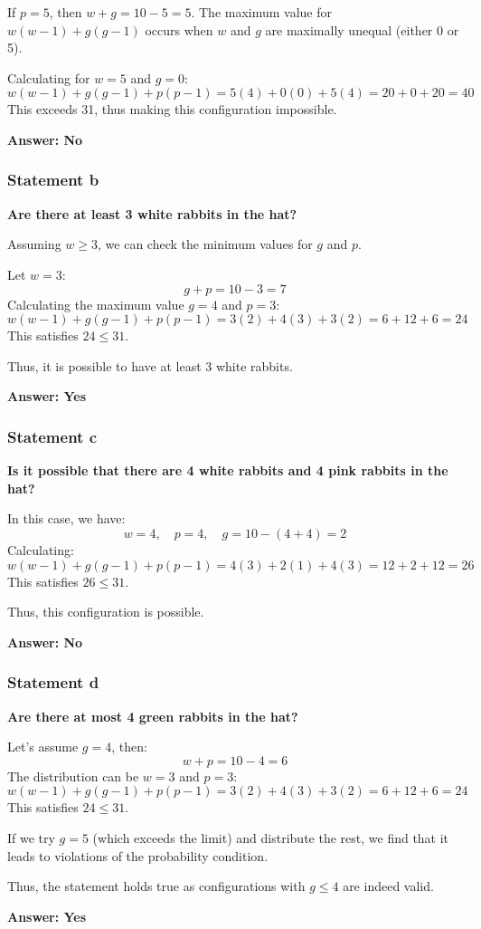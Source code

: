 \documentclass{article}
\begin{document}
If \( p = 5 \), then \( w + g = 10 - 5 = 5 \). The maximum value for \( w(w-1) + g(g-1) \) occurs when \( w \) and \( g \) are maximally unequal (either 0 or 5).

Calculating for \( w = 5 \) and \( g = 0 \):
\[
w(w-1) + g(g-1) + p(p-1) = 5(4) + 0(0) + 5(4) = 20 + 0 + 20 = 40
\]
This exceeds 31, thus making this configuration impossible.

\textbf{Answer: No}

\subsubsection{Statement b}
\textbf{Are there at least 3 white rabbits in the hat?}

Assuming \( w \geq 3 \), we can check the minimum values for \( g \) and \( p \).

Let \( w = 3 \):
\[
g + p = 10 - 3 = 7
\]
Calculating the maximum value \( g = 4 \) and \( p = 3 \):
\[
w(w-1) + g(g-1) + p(p-1) = 3(2) + 4(3) + 3(2) = 6 + 12 + 6 = 24
\]
This satisfies \( 24 \leq 31 \).

Thus, it is possible to have at least 3 white rabbits.

\textbf{Answer: Yes}

\subsubsection{Statement c}
\textbf{Is it possible that there are 4 white rabbits and 4 pink rabbits in the hat?}

In this case, we have:
\[
w = 4, \quad p = 4, \quad g = 10 - (4 + 4) = 2
\]
Calculating:
\[
w(w-1) + g(g-1) + p(p-1) = 4(3) + 2(1) + 4(3) = 12 + 2 + 12 = 26
\]
This satisfies \( 26 \leq 31 \).

Thus, this configuration is possible.

\textbf{Answer: No}

\subsubsection{Statement d}
\textbf{Are there at most 4 green rabbits in the hat?}

Let’s assume \( g = 4 \), then:
\[
w + p = 10 - 4 = 6
\]
The distribution can be \( w = 3 \) and \( p = 3 \):
\[
w(w-1) + g(g-1) + p(p-1) = 3(2) + 4(3) + 3(2) = 6 + 12 + 6 = 24
\]
This satisfies \( 24 \leq 31 \).

If we try \( g = 5 \) (which exceeds the limit) and distribute the rest, we find that it leads to violations of the probability condition.

Thus, the statement holds true as configurations with \( g \leq 4 \) are indeed valid.

\textbf{Answer: Yes}
\end{document}
